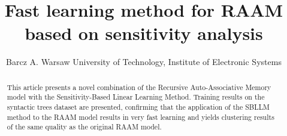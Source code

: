 \documentclass[]{spie}  %
\title{Fast learning method for RAAM based on sensitivity analysis}
\author{
Barcz A.
\skiplinehalf
Warsaw University of Technology, Institute of Electronic Systems
}
\begin{document}
 
\maketitle 

\begin{abstract}
This article presents a novel combination of the Recursive Auto-Associative Memory model with the Sensitivity-Based Linear Learning Method. Training results on the syntactic trees dataset are presented, confirming that the application of the SBLLM method to the RAAM model results in very fast learning and yields clustering results of the same quality as the original RAAM model.
\end{abstract}



\end{document}
